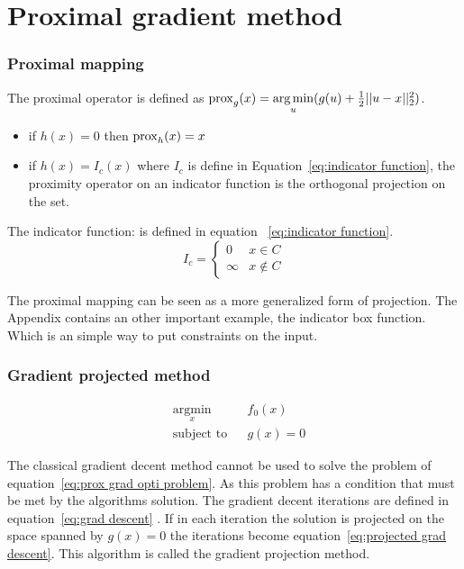 \chapter{Proximal gradient method}
	\subsection{Proximal mapping}
		The proximal operator is defined as $\operatorname{prox}_g(x)= \underset{u}{\operatorname*{arg\,min}}(g(u) + \frac{1}{2}||u-x||^2_2)$. 
		
		\begin{itemize}
			\item if $h(x)=0$ then $\operatorname{prox}_h(x)=x$ 
			\item if $h(x)=I_c(x)$ where $I_c$ is define in Equation~\ref{eq:indicator function}, the proximity operator on an indicator function is the orthogonal projection on the set.
		\end{itemize}
		
		The indicator function: is defined in equation ~\ref{eq:indicator function}.
		\begin{equation}
			I_c = 
			\begin{cases}
			0 & x \in C  \\
			\infty & x \notin C
			\end{cases}
			\label{eq:indicator function}
		\end{equation}
		
	The proximal mapping can be seen as a more generalized form of projection. The Appendix contains an other important example, the indicator box function. Which is an simple way to put constraints on the input.
	
	\subsection{Gradient projected method}
		
		\begin{equation}
			\begin{aligned}
			& \underset{x}{\text{argmin}}
			& & f_0(x) \\
			& \text{subject to}
			& & g(x)=0
			\end{aligned}
			\label{eq:prox grad opti problem}
		\end{equation}
		
		The classical gradient decent method cannot be used to solve the problem of equation~\ref{eq:prox grad opti problem}. As this problem has a condition that must be met by the algorithms solution. The gradient decent iterations are defined in equation~\ref{eq:grad descent} . If in each iteration the solution is projected on the space spanned by $g(x)=0$ the iterations become equation~\ref{eq:projected grad descent}. This algorithm is called the gradient projection method.
		
